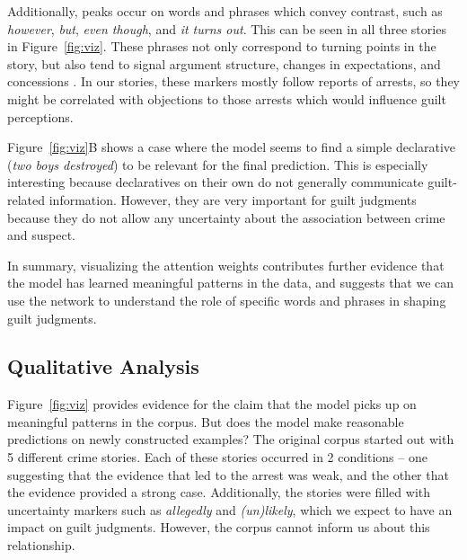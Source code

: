 \documentclass[11pt,a4paper]{article}
\newcommand{\word}[1]{\emph{#1}}
\begin{document}
Additionally, peaks occur on words and phrases which convey contrast, such as \word{however}, \word{but}, \word{even though}, and \word{it turns out}. This can be seen in all three stories in Figure~\ref{fig:viz}. These phrases not only correspond to turning points in the story, but also tend to signal argument structure, changes in expectations, and concessions \citep{RLakoff:1971,Merin:1999,Blakemore01}. In our stories, these markers mostly follow reports of arrests, so they might be correlated with objections to those arrests which would influence guilt perceptions.

Figure~\ref{fig:viz}B shows a case where the model seems to find a simple declarative (\word{two boys destroyed}) to be relevant for the final prediction. This is especially interesting because declaratives on their own do not generally communicate guilt-related information. However, they are very important for guilt judgments because they do not allow any uncertainty about the association between crime and suspect.

In summary, visualizing the attention weights contributes further evidence that the model has learned meaningful patterns in the data, and suggests that we can use the network to understand the role of specific words and phrases in shaping guilt judgments.


\subsection{Qualitative Analysis}

Figure~\ref{fig:viz} provides evidence for the claim that the model picks up on meaningful patterns in the corpus. But does the model make reasonable predictions on newly constructed examples?  The original corpus started out with 5 different crime stories. Each of these stories occurred in 2 conditions -- one suggesting that the evidence that led to the arrest was weak, and the other that the evidence provided a strong case. Additionally, the stories were filled with uncertainty markers such as \word{allegedly} and \word{(un)likely}, which we expect to have an impact on guilt judgments. However, the corpus cannot inform us about this relationship.
\end{document}
